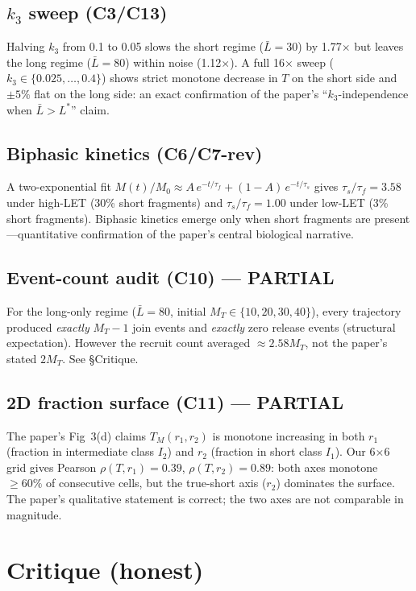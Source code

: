 \documentclass[11pt]{article}
\begin{document}
\subsection{$k_3$ sweep (C3/C13)}
Halving $k_3$ from 0.1 to 0.05 slows the short regime ($\bar L=30$) by 1.77$\times$ but
leaves the long regime ($\bar L=80$) within noise (1.12$\times$). A full 16$\times$ sweep
($k_3 \in \{0.025,\ldots,0.4\}$) shows strict monotone decrease in $T$ on the short side
and $\pm 5\%$ flat on the long side: an exact confirmation of the paper's
``$k_3$-independence when $\bar L > L^\ast$'' claim.

\subsection{Biphasic kinetics (C6/C7-rev)}
A two-exponential fit $M(t)/M_0 \approx A\,e^{-t/\tau_f} + (1-A)\,e^{-t/\tau_s}$
gives $\tau_s/\tau_f = 3.58$ under high-LET (30\% short fragments) and $\tau_s/\tau_f = 1.00$
under low-LET (3\% short fragments). Biphasic kinetics emerge only when short fragments
are present---quantitative confirmation of the paper's central biological narrative.

\subsection{Event-count audit (C10) --- PARTIAL}
For the long-only regime ($\bar L=80$, initial $M_T \in \{10,20,30,40\}$), every
trajectory produced \emph{exactly} $M_T{-}1$ join events and \emph{exactly} zero release
events (structural expectation). However the recruit count averaged $\approx 2.58 M_T$,
not the paper's stated $2 M_T$. See \S Critique.

\subsection{2D fraction surface (C11) --- PARTIAL}
The paper's Fig~3(d) claims $T_M(r_1,r_2)$ is monotone increasing in both $r_1$
(fraction in intermediate class $I_2$) and $r_2$ (fraction in short class $I_1$).
Our 6$\times$6 grid gives Pearson $\rho(T,r_1)=0.39$, $\rho(T,r_2)=0.89$: both axes
monotone $\geq 60\%$ of consecutive cells, but the true-short axis ($r_2$)
dominates the surface. The paper's qualitative statement is correct; the two axes
are not comparable in magnitude.

\section*{Critique (honest)}
\end{document}
